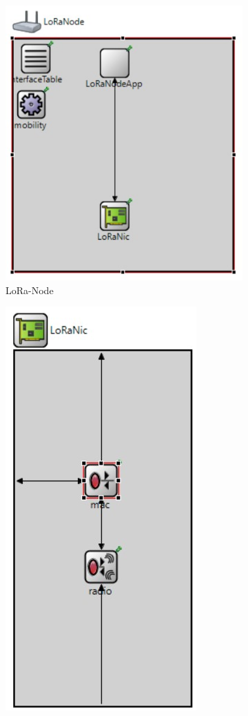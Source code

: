             \begin{figure}[h!]
            \centering
                \begin{subfigure}[b]{0,4\textwidth}
                \centering
            \includegraphics[width=0.8\columnwidth]{images/node.jpg}
            \caption{LoRa-Node}
            \label{fig:loRa-node}
            \end{subfigure}
            \hfill
            \begin{subfigure}[b]{0,4\textwidth}
            \centering
            \includegraphics[width=0.5\columnwidth]{images/nic.jpg}

\end{subfigure}
\end{figure}
